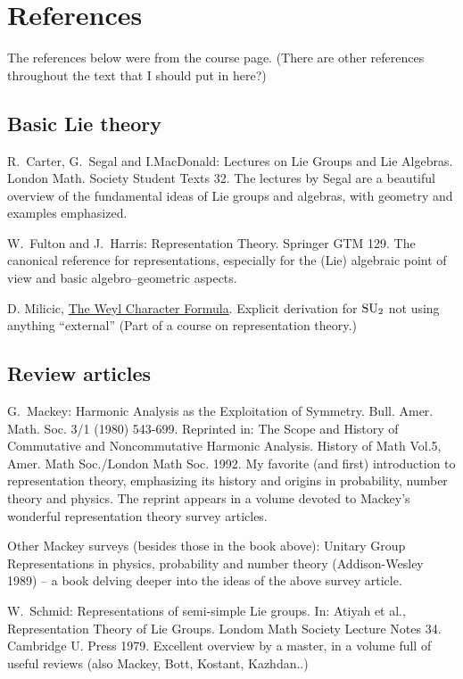 \section*{References}
The references below were from the course page. (There are other references throughout the text that I should put in here?)
{\footnotesize
\subsection*{\hspace{1em}Basic Lie theory}
 R.~Carter, G.~Segal and I.MacDonald: Lectures on Lie Groups and Lie Algebras. London Math. Society Student Texts 32. The lectures by Segal are a beautiful overview of the fundamental ideas of Lie groups and algebras, with geometry and examples emphasized.

W.~Fulton and J.~Harris: Representation Theory. Springer GTM 129. The canonical reference for representations, especially for the (Lie) algebraic point of view and basic algebro--geometric aspects.

D. Milicic, \href{https://www.math.utah.edu/~milicic/Math_6260/weyl_character.pdf}{The Weyl Character Formula}. Explicit derivation for $\operatorname{SU}_2$ not using anything ``external'' (Part of a course on representation theory.)
\subsection*{\hspace{1em}Review articles}
G.~Mackey: Harmonic Analysis as the Exploitation of Symmetry. Bull. Amer. Math. Soc. 3/1 (1980) 543-699. Reprinted in: The Scope and History of Commutative and Noncommutative Harmonic Analysis. History of Math Vol.5, Amer. Math Soc./London Math Soc. 1992. My favorite (and first) introduction to representation theory, emphasizing its history and origins in probability, number theory and physics. The reprint appears in a volume devoted to Mackey's wonderful representation theory survey articles.

Other Mackey surveys (besides those in the book above): Unitary Group Representations in physics, probability and number theory (Addison-Wesley 1989) -- a book delving deeper into the ideas of the above survey article.

W.~Schmid: Representations of semi-simple Lie groups. In: Atiyah et al., Representation Theory of Lie Groups. Londom Math Society Lecture Notes 34. Cambridge U. Press 1979. Excellent overview by a master, in a volume full of useful reviews (also Mackey, Bott, Kostant, Kazhdan..)

}
